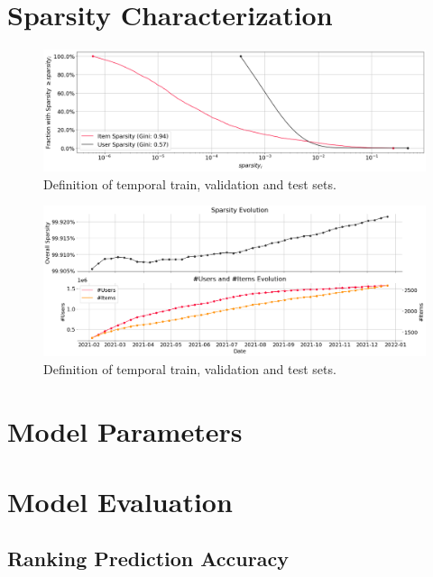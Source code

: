\pagebreak
\section{Sparsity Characterization}

\begin{figure}[h]
    \centering
    \includegraphics[width=\textwidth]{figs/chap5/sparsity_ccdf.png}
    \caption{Definition of temporal train, validation and test sets.}
    \label{fig:sparsity_ccdf}
\end{figure}

\begin{figure}[h]
    \centering
    \includegraphics[width=\textwidth]{figs/chap5/sparsity_evolution.png}
    \caption{Definition of temporal train, validation and test sets.}
    \label{fig:sparsity_evolution}
\end{figure}

\section{Model Parameters}

\pagebreak
\section{Model Evaluation}

\subsection{Ranking Prediction Accuracy}

